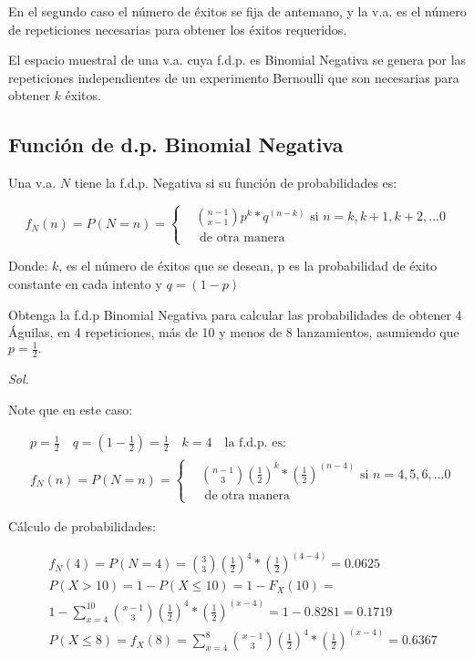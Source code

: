 En el segundo caso el número de éxitos se fija de antemano, y la v.a. es el número de repeticiones necesarias para obtener los éxitos requeridos.

El espacio muestral de una v.a. cuya f.d.p. es Binomial Negativa se genera por las repeticiones independientes de un experimento Bernoulli que son necesarias para obtener $k$ éxitos.

\subsection{Función de d.p. Binomial Negativa}

Una v.a. $N$ tiene la f.d.p. Negativa si su función de probabilidades es:

\begin{equation}
    f_N(n)=P(N=n)=\begin{cases}
         & \binom{n-1}{x-1}p^k*q^{(n-k )} \text{ si } n=k,k+1,k+2,\dots 0 \\
         & \text{ de otra manera}\end{cases}
\end{equation}

Donde: $k$, es el número de éxitos que se desean, p es la probabilidad de éxito constante en cada intento y $q=(1-p)$

\begin{example}
    Obtenga la f.d.p Binomial Negativa para calcular las probabilidades de obtener 4 Águilas, en 4 repeticiones, más de 10 y menos de 8 lanzamientos, asumiendo que $p=\frac{1}{2}.$

\end{example}

\textit{ Sol. }

Note que en este caso:

\begin{align*}
    & p=\frac{1}{2} \quad q=(1-\frac{1}{2})=\frac{1}{2}\quad k=4\quad \text{la f.d.p. es: }\\
    &f_N(n)=P(N=n)=\begin{cases}
        & \binom{n-1}{3}\left(\frac{1}{2}\right)^k*\left(\frac{1}{2}\right)^{(n-4)}\text{ si } n=4,5,6,\dots 0 \\
        & \text{ de otra manera}
   \end{cases}
\end{align*}

Cálculo de probabilidades:

\begin{align*}
     & f_N(4)=P(N=4)=\binom{3}{3}\left(\frac{1}{2}\right)^4*\left(\frac{1}{2}\right)^(4-4)=0.0625                                                   \\
     & P(X>10)=1-P(X\leq 10)= 1-F_X(10)=\\
     &1-\sum_{x=4}^{10}\binom{x-1}{3}\left(\frac{1}{2}\right)^4*\left(\frac{1}{2}\right)^{(x-4)}=1-0.8281=0.1719 \\
     & P( X\leq 8)=f_X(8)=\sum_{x=4}^8\binom{x-1}{3}\left(\frac{1}{2}\right)^4*\left(\frac{1}{2}\right)^{(x-4)}=0.6367
\end{align*}

